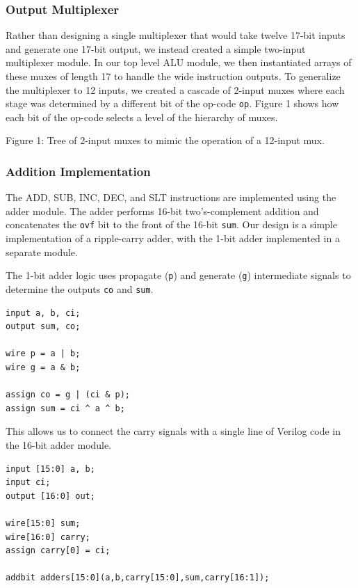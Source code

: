 \documentclass[11pt]{article}
\begin{document}
\subsubsection{Output Multiplexer}
Rather than designing a single multiplexer that would take twelve 17-bit inputs and generate one 17-bit output, we instead created a simple two-input multiplexer module. In our top level ALU module, we then instantiated arrays of these muxes of length 17 to handle the wide instruction outputs. To generalize the multiplexer to 12 inputs, we created a cascade of 2-input muxes where each stage was determined by a different bit of the op-code \texttt{op}. Figure 1 shows how each bit of the op-code selects a level of the hierarchy of muxes. \\


Figure 1: Tree of 2-input muxes to mimic the operation of a 12-input mux.

\subsubsection{Addition Implementation} 
The ADD, SUB, INC, DEC, and SLT instructions are implemented using the adder module. The adder performs 16-bit two's-complement addition and concatenates the \texttt{ovf} bit to the front of the 16-bit \texttt{sum}. Our design is a simple implementation of a ripple-carry adder, with the 1-bit adder implemented in a separate module. 

The 1-bit adder logic uses propagate (\texttt{p}) and generate (\texttt{g}) intermediate signals to determine the outputs \texttt{co} and \texttt{sum}.

\begin{lstlisting}
input a, b, ci;
output sum, co;

wire p = a | b;
wire g = a & b;

assign co = g | (ci & p);
assign sum = ci ^ a ^ b;
\end{lstlisting}

This allows us to connect the carry signals with a single line of Verilog code in the 16-bit adder module.

\begin{lstlisting}
input [15:0] a, b;
input ci;
output [16:0] out;

wire[15:0] sum;
wire[16:0] carry;
assign carry[0] = ci;

addbit adders[15:0](a,b,carry[15:0],sum,carry[16:1]);
\end{lstlisting}
\end{document}

